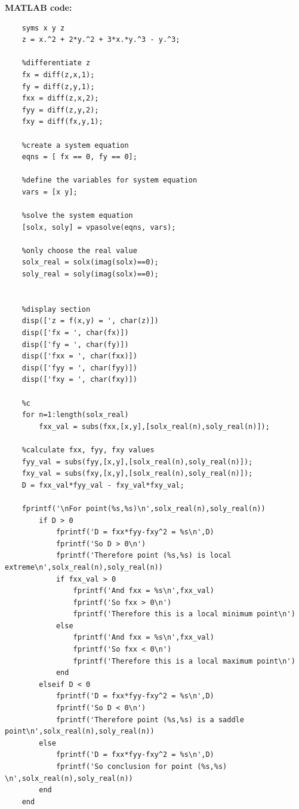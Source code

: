 \vspace*{1cm}

\textbf {MATLAB code: }
\begin{lstlisting}[style=Matlab-editor]
    %calculation
    syms x y z
    z = x.^2 + 2*y.^2 + 3*x.*y.^3 - y.^3;
    
    %differentiate z 
    fx = diff(z,x,1);   
    fy = diff(z,y,1);
    fxx = diff(z,x,2);
    fyy = diff(z,y,2);
    fxy = diff(fx,y,1);
    
    %create a system equation
    eqns = [ fx == 0, fy == 0];
    
    %define the variables for system equation
    vars = [x y];
    
    %solve the system equation
    [solx, soly] = vpasolve(eqns, vars);
    
    %only choose the real value
    solx_real = solx(imag(solx)==0);
    soly_real = soly(imag(solx)==0);
     
     
    %display section
    disp(['z = f(x,y) = ', char(z)])
    disp(['fx = ', char(fx)])
    disp(['fy = ', char(fy)])
    disp(['fxx = ', char(fxx)])
    disp(['fyy = ', char(fyy)])
    disp(['fxy = ', char(fxy)])
     
    %c
    for n=1:length(solx_real)
        fxx_val = subs(fxx,[x,y],[solx_real(n),soly_real(n)]);
    
    %calculate fxx, fyy, fxy values
    fyy_val = subs(fyy,[x,y],[solx_real(n),soly_real(n)]);
    fxy_val = subs(fxy,[x,y],[solx_real(n),soly_real(n)]);
    D = fxx_val*fyy_val - fxy_val*fxy_val;
    
    fprintf('\nFor point(%s,%s)\n',solx_real(n),soly_real(n))
        if D > 0
            fprintf('D = fxx*fyy-fxy^2 = %s\n',D)
            fprintf('So D > 0\n')
            fprintf('Therefore point (%s,%s) is local extreme\n',solx_real(n),soly_real(n))
            if fxx_val > 0
                fprintf('And fxx = %s\n',fxx_val)
                fprintf('So fxx > 0\n')
                fprintf('Therefore this is a local minimum point\n')
            else
                fprintf('And fxx = %s\n',fxx_val)
                fprintf('So fxx < 0\n')
                fprintf('Therefore this is a local maximum point\n')
            end
        elseif D < 0
            fprintf('D = fxx*fyy-fxy^2 = %s\n',D)
            fprintf('So D < 0\n')
            fprintf('Therefore point (%s,%s) is a saddle point\n',solx_real(n),soly_real(n))
        else
            fprintf('D = fxx*fyy-fxy^2 = %s\n',D)
            fprintf('So conclusion for point (%s,%s) \n',solx_real(n),soly_real(n))
        end
    end    
\end{lstlisting}

